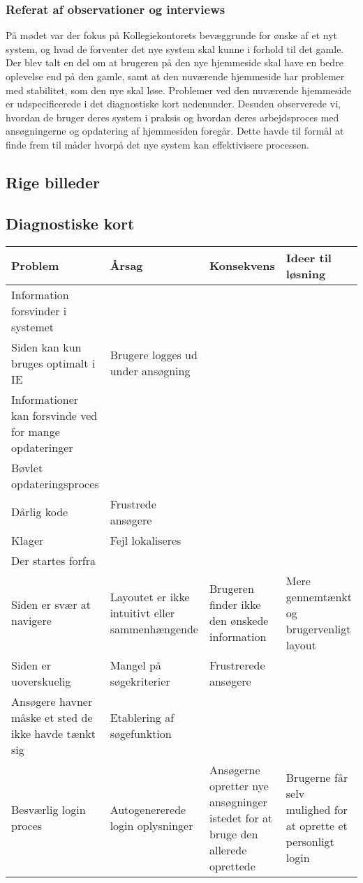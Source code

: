 \documentclass[12pt, a4paper]{report}
\begin{document}
\begin{itemize}
\subsubsection{Referat af observationer og interviews}
På mødet var der fokus på Kollegiekontorets bevæggrunde for ønske af et nyt system, og hvad de forventer det nye system skal kunne i forhold til det gamle. Der blev talt en del om at brugeren på den nye hjemmeside skal have en bedre oplevelse end på den gamle, samt at den nuværende hjemmeside har problemer med stabilitet, som den nye skal løse. Problemer ved den nuværende hjemmeside er udspecificerede i det diagnostiske kort nedenunder.
Desuden observerede vi, hvordan de bruger deres system i praksis og hvordan deres arbejdsproces med ansøgningerne og opdatering af hjemmesiden foregår. Dette havde til formål at finde frem til måder hvorpå det nye system kan effektivisere processen.

\subsection{Rige billeder}

\subsection{Diagnostiske kort}
\begin{tabular}{| l | l | l | l |}
\hline
Problem & Årsag & Konsekvens & Ideer til løsning \\ \hline
Information forsvinder i systemet \tabularnewline Siden kan kun bruges optimalt i IE & Brugere logges ud under ansøgning \tabularnewline Informationer kan forsvinde ved for mange opdateringer \tabularnewline Bøvlet opdateringsproces \tabularnewline Dårlig kode & Frustrede ansøgere \tabularnewline Klager & Fejl lokaliseres \tabularnewline Der startes forfra \\ \hline

Siden er svær at navigere & Layoutet er ikke intuitivt eller sammenhængende & Brugeren finder ikke den ønskede information & Mere gennemtænkt og brugervenligt layout \\ \hline

Siden er uoverskuelig & Mangel på søgekriterier & Frustrerede ansøgere \tabularnewline Ansøgere havner måske et sted de ikke havde tænkt sig & Etablering af søgefunktion \\ \hline

Besværlig login proces & Autogenererede login oplysninger & Ansøgerne opretter nye ansøgninger istedet for at bruge den allerede oprettede & Brugerne får selv mulighed for at oprette et personligt login \\ \hline


\end{tabular}
\end{itemize}
\end{document}
